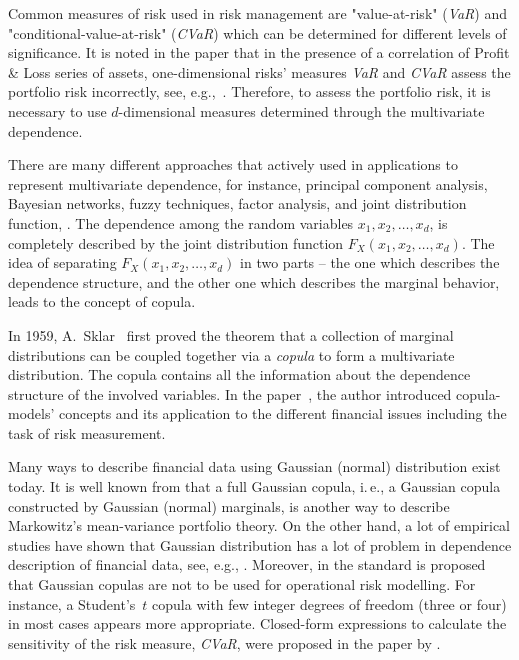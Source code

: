 \vspace{\fill}

\endgroup



Common measures of risk used in risk management are "value-at-risk" (\textit{VaR}) and "conditional-value-at-risk" (\textit{CVaR}) which can be determined for different levels of significance. 
It is noted in the paper \cite{Kritski2007} that in the presence of a correlation of Profit \& Loss series of assets, one-dimensional risks' measures \textit{VaR} and \textit{CVaR} assess the portfolio risk incorrectly, see, e.g.,~\cite{Rachev2005}. 
Therefore, to assess the portfolio risk, it is necessary to use $d$-dimensional measures determined through the multivariate dependence.

There are many different approaches that actively used in applications to represent multivariate dependence, for instance, principal component analysis, Bayesian networks, fuzzy techniques, factor analysis, and joint distribution function, \cite{Huynh2014, Kole2007}. 
The dependence among the random variables $x_1, x_2, \ldots, x_d$, is completely described by the joint distribution function $F_X(x_1, x_2, \ldots, x_d)$. 
The idea of separating $F_X(x_1, x_2, \ldots, x_d)$ in two parts -- the one which describes the dependence structure, and the other one which describes the marginal behavior, leads to the concept of copula.

In 1959, A.~Sklar~\cite{Sklar1959} first proved the theorem that a collection of marginal distributions can be coupled together via a \textit{copula} to form a multivariate distribution.
The copula contains all the information about the dependence structure of the involved variables.
In the paper~\cite{Penikas2010}, the author introduced copula-models' concepts and its application to the different financial issues including the task of risk measurement.

Many ways to describe financial data using Gaussian (normal) distribution exist today. 
It is well known from \cite{Xu2008} that a full Gaussian copula, i.\,e., a Gaussian copula constructed by Gaussian (normal) marginals, is another way to describe Markowitz's mean-variance portfolio theory. 
On the other hand, a lot of empirical studies have shown that Gaussian distribution has a lot of problem in dependence description of financial data, see, e.g., \cite{Rachev2005, Limp2011, Wilmott2007, Pourkhanali2016}. 
Moreover, in the standard \cite{EBA2015} is proposed that Gaussian copulas are not to be used for operational risk modelling. 
For instance, a Student's~$t$ copula with few integer degrees of freedom (three or four) in most cases appears more appropriate.
Closed-form expressions to calculate the sensitivity of the risk measure, \textit{CVaR}, were proposed in the paper by \cite{Stoyanov2013}.

